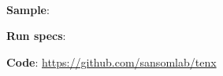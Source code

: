 \documentclass{article}
\begin{document}
\title{\reportTitle \\
  \vspace{5mm}
  \large \projectName \\
}

\author{\reportAuthor}
\maketitle


\vspace{\fill}
\noindent
{\large \textbf{Sample}: \sample}

\vspace{3mm}
\noindent
{\large \textbf{Run specs}: \runDetails}

\vspace{3mm}
\noindent
{\large \textbf{Code}: \url{https://github.com/sansomlab/tenx}}



\clearpage


\tableofcontents

\clearpage
\end{document}
